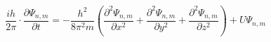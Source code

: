 \documentclass{article}
\begin{document}
	\huge
	$$
		\frac{ih}{2\pi}\cdot\frac{\partial\Psi_{n,m}}{\partial t} =-\frac{h^2}{8\pi^2m} \left(\frac{\partial^2\Psi_{n,m}}{\partial x^2} +\frac{\partial^2\Psi_{n,m}}{\partial y^2} +\frac{\partial^2\Psi_{n,m}}{\partial z^2}\right) +U\Psi_{n,m}
	$$
\end{document}
